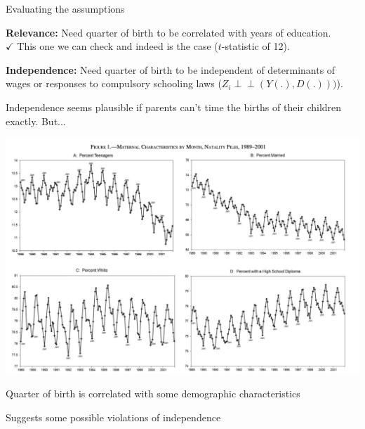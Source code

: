 \documentclass[11pt,english,handout]{beamer}
\newenvironment{wideitemize}{\itemize\addtolength{\itemsep}{10pt}}{\enditemize}
\newcommand{\indep}{\perp\!\!\!\!\perp}
\begin{document}
\begin{frame}{Evaluating the assumptions}
	\begin{wideitemize}
		
		\item \textbf{Relevance:} \pause{} Need quarter of birth to be correlated with years of education. \pause{} \\
		$\checkmark$ This one we can check and indeed is the case ($t$-statistic of 12).
		
		
		\pause
		\item \textbf{Independence:} \pause Need quarter of birth to be independent of determinants of wages or responses to compulsory schooling laws ($Z_i \indep (Y(.), D(.)))$). 
		
		\pause
		\item
		Independence seems plausible if parents can't time the births of their children exactly. \pause{} But...
	\end{wideitemize}	
	
\end{frame}

\begin{frame}
\includegraphics[width = 0.8\linewidth]{qob-characteristics}

\begin{wideitemize}
	\item
	Quarter of birth is correlated with some demographic characteristics
	
	\item
	Suggests some possible violations of independence
\end{wideitemize}
\end{frame}
\end{document}

